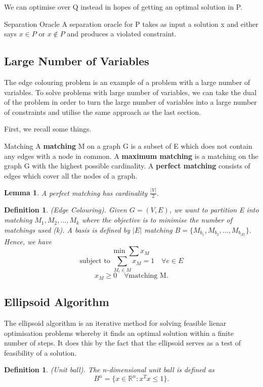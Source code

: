 \documentclass[twoside]{article}
\newtheorem{lemma}[theorem]{Lemma}
\newtheorem{definition}[theorem]{Definition}
\begin{document}
We can optimise over Q instead in hopes of getting an optimal solution in P.

\begin{definition_exam}{Separation Oracle}{} A separation oracle for P takes as input a solution x and either says $x \in P$ or $x \not \in P$ and produces a violated constraint.
\end{definition_exam}


\subsection{Large Number of Variables}
The edge colouring problem is an example of a problem with a large number of variables. To solve problems with large number of variables, we can take the dual of the problem in order to turn the large number of variables into a large number of constraints and utilise the same approach as the last section.

First, we recall some things.

\begin{definition_exam}{Matching}{} A \textbf{matching} M on a graph G is a subset of E which does not contain any edges with a node in common. A \textbf{maximum matching} is a matching on the graph G with the highest possible cardinality. A \textbf{perfect matching} consists of edges which cover all the nodes of a graph.
\end{definition_exam}

\begin{lemma}A perfect matching has cardinality $\frac{|V|}{2}$.
\end{lemma}

\begin{definition}(Edge Colouring). Given $G=(V,E)$, we want to partition E into matching $M_1,M_2,...,M_k$ where the objective is to minimise the number of matchings used (k). A basis is defined by $|E|$ matching $B = \{M_{b_{1}},M_{b_{2}},...,M_{b_{|E|}}\}$. Hence, we have 
$$
\text{min } \sum x_M
$$
$$
\text{subject to } \sum_{M_{i} \in M}x_M = 1 \quad \forall e \in E
$$
$$
x_M \geq 0 \quad \forall \text{matching M.}
$$
\end{definition}

\subsection{Ellipsoid Algorithm}
The ellipsoid algorithm is an iterative method for solving feasible lienar optimisation problems whereby it finds an optimal solution within a finite number of steps. It does this by the fact that the ellipsoid serves as a test of feasibility of a solution.
\begin{definition}(Unit ball). The n-dimensional unit ball is defined as 
$$
B^n = \{x \in \mathbb{R}^n: x^Tx \leq 1\}.
$$
\end{definition}
\end{document}
